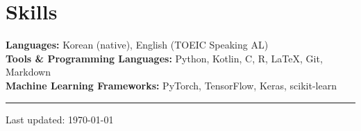 \documentclass[10pt,a4paper]{article}
\begin{document}
\section*{Skills}
\textbf{Languages:} Korean (native), English (TOEIC Speaking AL) \\
\textbf{Tools \& Programming Languages:} Python, Kotlin, C, R, \LaTeX{}, Git, Markdown \\
\textbf{Machine Learning Frameworks:} PyTorch, TensorFlow, Keras, scikit-learn

\vspace{14pt}
\hrule
\vspace{4pt}
\begin{center}\small\color{midgray} Last updated: \today\end{center}
\end{document}
